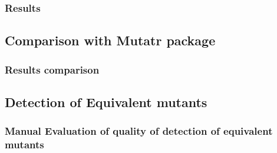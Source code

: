 \subsubsection{Results}

\subsection{Comparison with Mutatr package}

 
\subsubsection{Results comparison}


\subsection{Detection of Equivalent mutants}

\subsubsection{Manual Evaluation of quality of detection of equivalent mutants}